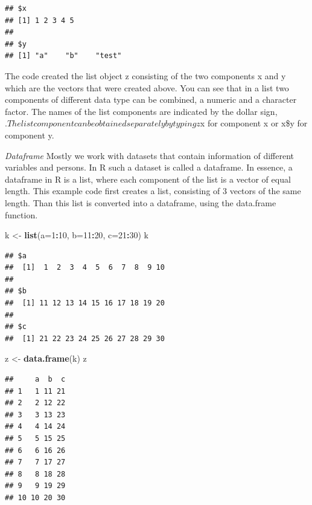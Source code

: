 \documentclass[]{book}
\newenvironment{Shaded}{\begin{snugshade}}{\end{snugshade}}
\newcommand{\KeywordTok}[1]{\textcolor[rgb]{0.13,0.29,0.53}{\textbf{#1}}}
\newcommand{\DataTypeTok}[1]{\textcolor[rgb]{0.13,0.29,0.53}{#1}}
\newcommand{\DecValTok}[1]{\textcolor[rgb]{0.00,0.00,0.81}{#1}}
\newcommand{\StringTok}[1]{\textcolor[rgb]{0.31,0.60,0.02}{#1}}
\newcommand{\OperatorTok}[1]{\textcolor[rgb]{0.81,0.36,0.00}{\textbf{#1}}}
\newcommand{\NormalTok}[1]{#1}
\begin{document}
\begin{verbatim}
## $x
## [1] 1 2 3 4 5
## 
## $y
## [1] "a"    "b"    "test"
\end{verbatim}

The code created the list object z consisting of the two components x
and y which are the vectors that were created above. You can see that in
a list two components of different data type can be combined, a numeric
and a character factor. The names of the list components are indicated
by the dollar sign,
\(. The list component can be obtained separately by typing z\)x for
component x or x\$y for component y.

\emph{Dataframe} Mostly we work with datasets that contain information
of different variables and persons. In R such a dataset is called a
dataframe. In essence, a dataframe in R is a list, where each component
of the list is a vector of equal length. This example code first creates
a list, consisting of 3 vectors of the same length. Than this list is
converted into a dataframe, using the data.frame function.

\begin{Shaded}
\begin{Highlighting}[]
\NormalTok{k <-}\StringTok{ }\KeywordTok{list}\NormalTok{(}\DataTypeTok{a=}\DecValTok{1}\OperatorTok{:}\DecValTok{10}\NormalTok{, }\DataTypeTok{b=}\DecValTok{11}\OperatorTok{:}\DecValTok{20}\NormalTok{, }\DataTypeTok{c=}\DecValTok{21}\OperatorTok{:}\DecValTok{30}\NormalTok{)}
\NormalTok{k}
\end{Highlighting}
\end{Shaded}

\begin{verbatim}
## $a
##  [1]  1  2  3  4  5  6  7  8  9 10
## 
## $b
##  [1] 11 12 13 14 15 16 17 18 19 20
## 
## $c
##  [1] 21 22 23 24 25 26 27 28 29 30
\end{verbatim}

\begin{Shaded}
\begin{Highlighting}[]
\NormalTok{z <-}\StringTok{ }\KeywordTok{data.frame}\NormalTok{(k)}
\NormalTok{z}
\end{Highlighting}
\end{Shaded}

\begin{verbatim}
##     a  b  c
## 1   1 11 21
## 2   2 12 22
## 3   3 13 23
## 4   4 14 24
## 5   5 15 25
## 6   6 16 26
## 7   7 17 27
## 8   8 18 28
## 9   9 19 29
## 10 10 20 30
\end{verbatim}
\end{document}
